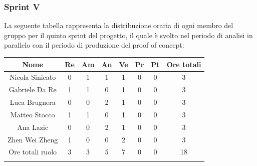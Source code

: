 \subsubsection{Sprint V}
%
La seguente tabella rappresenta la distribuzione oraria di ogni membro del gruppo per il quinto sprint del progetto, il quale è svolto nel periodo di analisi in parallelo con il periodo di produzione del proof of concept:

\setlength\extrarowheight{5pt}
\begin{tabularx}{\textwidth}{|ccccccc|c|}
	\hline
	\rowcolor{white}
	\textbf{Nome} & \textbf{Re} & \textbf{Am} & \textbf{An} & \textbf{Ve} & \textbf{Pr}& \textbf{Pt} & \textbf{Ore totali} \\
	\hline
	Nicola Sinicato &0&1&1&1&0&0&3 \\
	Gabriele Da Re &1&1&0&1&0&0&3 \\
	Luca Brugnera &0&0&2&1&0&0&3 \\
	Matteo Stocco &1&1&0&1&0&0&3 \\
	Ana Lazic &0&0&2&1&0&0&3 \\
	Zhen Wei Zheng &1&0&0&2&0&0&3 \\
	\hline
	Ore totali ruolo &3&3&5&7&0&0&18 \\
	\hline
	\rowcolor{white}
	\caption{Distribuzione oraria durante il quinto sprint per ruolo e persona}
\end{tabularx}
\vspace{10pt}

